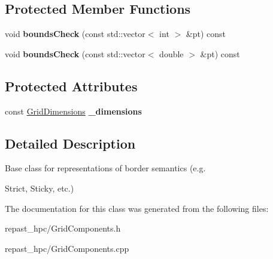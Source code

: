 \subsection*{Protected Member Functions}
\begin{DoxyCompactItemize}
\item 
\hypertarget{classrepast_1_1_borders_a66336724557f7040d1240b771be1362a}{void {\bfseries bounds\-Check} (const std\-::vector$<$ int $>$ \&pt) const }\label{classrepast_1_1_borders_a66336724557f7040d1240b771be1362a}

\item 
\hypertarget{classrepast_1_1_borders_a9e364b71465c459a638551c40653440a}{void {\bfseries bounds\-Check} (const std\-::vector$<$ double $>$ \&pt) const }\label{classrepast_1_1_borders_a9e364b71465c459a638551c40653440a}

\end{DoxyCompactItemize}
\subsection*{Protected Attributes}
\begin{DoxyCompactItemize}
\item 
\hypertarget{classrepast_1_1_borders_a1e0e3961f4312901cd1c4909d6647cea}{const \hyperlink{classrepast_1_1_grid_dimensions}{Grid\-Dimensions} {\bfseries \-\_\-dimensions}}\label{classrepast_1_1_borders_a1e0e3961f4312901cd1c4909d6647cea}

\end{DoxyCompactItemize}


\subsection{Detailed Description}
Base class for representations of border semantics (e.\-g. 

Strict, Sticky, etc.) 

The documentation for this class was generated from the following files\-:\begin{DoxyCompactItemize}
\item 
repast\-\_\-hpc/Grid\-Components.\-h\item 
repast\-\_\-hpc/Grid\-Components.\-cpp\end{DoxyCompactItemize}
